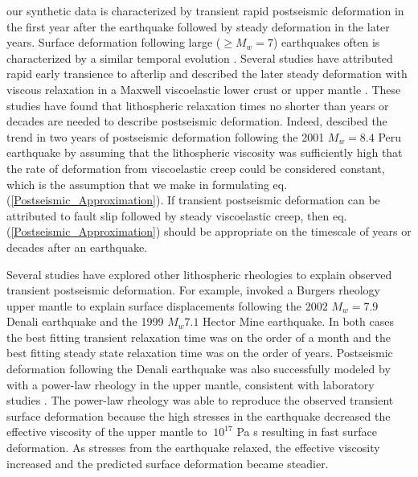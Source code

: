\documentclass[extra,mreferee]{gji}
\begin{document}
our synthetic data is characterized by transient rapid postseismic
deformation in the first year after the earthquake followed by steady
deformation in the later years.  Surface deformation following large
($\geq M_w=7$) earthquakes often is characterized by a similar
temporal evolution \citep[e.g.][]{SS1997,S2005,E2009}.  Several
studies have attributed rapid early transience to afterlip and
described the later steady deformation with viscous relaxation in a
Maxwell viscoelastic lower crust or upper mantle
\citep[e.g.][]{PA2005,J2009,H2008,F2006,R2015}.  These studies have
found that lithospheric relaxation times no shorter than years or
decades are needed to describe postseismic deformation.  Indeed,
\citet{PA2005} descibed the trend in two years of postseismic
deformation following the 2001 $M_w=8.4$ Peru earthquake by assuming
that the lithospheric viscosity was sufficiently high that the rate of
deformation from viscoelastic creep could be considered constant,
which is the assumption that we make in formulating
eq. (\ref{Postseismic_Approximation}). If transient postseismic
deformation can be attributed to fault slip followed by steady
viscoelastic creep, then eq. (\ref{Postseismic_Approximation}) should
be appropriate on the timescale of years or decades after an
earthquake.

Several studies have explored other lithospheric rheologies to explain
observed transient postseismic deformation.  For example,
\citet{P2003,P2005} invoked a Burgers rheology upper mantle to explain
surface displacements following the 2002 $M_w=7.9$ Denali earthquake
and the 1999 $M_w7.1$ Hector Mine earthquake.  In both cases the best
fitting transient relaxation time was on the order of a month and the
best fitting steady state relaxation time was on the order of years.
Postseismic deformation following the Denali earthquake was also
successfully modeled by \citet{F2006b} with a power-law rheology in
the upper mantle, consistent with laboratory studies
\citep[e.g.][]{KK1987}.  The power-law rheology was able to reproduce
the observed transient surface deformation because the high stresses
in the earthquake decreased the effective viscosity of the upper
mantle to $~10^{17}$ Pa s resulting in fast surface deformation.  As
stresses from the earthquake relaxed, the effective viscosity
increased and the predicted surface deformation became steadier.
\end{document}
